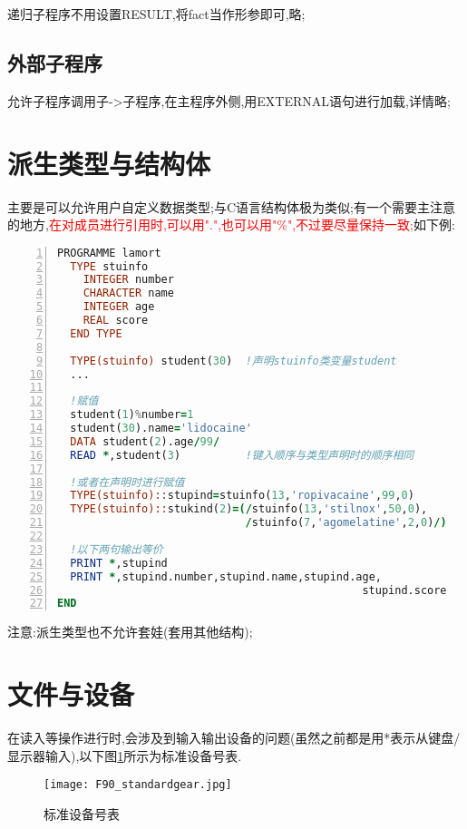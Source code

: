 递归子程序不用设置RESULT,将fact当作形参即可,略;



\subsection{外部子程序}
允许子程序调用子->子程序,在主程序外侧,用EXTERNAL语句进行加载,详情略;



\section{派生类型与结构体}
主要是可以允许用户自定义数据类型;与C语言结构体极为类似;有一个需要主注意的地方,\textcolor{red}{在对成员进行引用时,可以用".",也可以用"\%",不过要尽量保持一致;}如下例:

\begin{lstlisting}[numbers=left,frame=single,language=Fortran]
PROGRAMME lamort
  TYPE stuinfo
    INTEGER number
    CHARACTER name
    INTEGER age
    REAL score
  END TYPE
  
  TYPE(stuinfo) student(30)  !声明stuinfo类变量student
  ...
  
  !赋值
  student(1)%number=1
  student(30).name='lidocaine'
  DATA student(2).age/99/
  READ *,student(3)          !键入顺序与类型声明时的顺序相同
  
  !或者在声明时进行赋值
  TYPE(stuinfo)::stupind=stuinfo(13,'ropivacaine',99,0)
  TYPE(stuinfo)::stukind(2)=(/stuinfo(13,'stilnox',50,0),
                             /stuinfo(7,'agomelatine',2,0)/)
                             
  !以下两句输出等价                           
  PRINT *,stupind
  PRINT *,stupind.number,stupind.name,stupind.age,
                                               stupind.score
END
\end{lstlisting}
\par
注意:派生类型也不允许套娃(套用其他结构);


\section{文件与设备}

在读入等操作进行时,会涉及到输入输出设备的问题(虽然之前都是用*表示从键盘/显示器输入),以下图\ref{F90-standardgear}所示为标准设备号表.
\begin{figure}[h]
	\noindent
	\centering
	\texttt{[image: F90\_standardgear.jpg]}
	\caption{标准设备号表}
	\label{F90-standardgear}
\end{figure}

